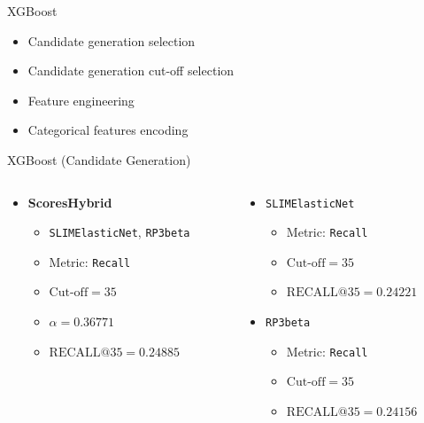 \documentclass{beamer}
\begin{document}
\begin{frame}{XGBoost}
  \begin{itemize}
    \item Candidate generation selection
    \item Candidate generation cut-off selection
    \item Feature engineering
    \item Categorical features encoding
  \end{itemize}
\end{frame}

\begin{frame}{XGBoost (Candidate Generation)}
  \begin{columns}[t]
    \begin{column}{0.5\textwidth}
      \begin{itemize}
        \item \textbf{ScoresHybrid}
        \begin{itemize}
          \item \texttt{SLIMElasticNet}, \texttt{RP3beta}
          \item Metric: \texttt{Recall}
          \item $\text{Cut-off}=35$
          \item $\alpha=0.36771$
          \item $\text{RECALL@}35=0.24885$
        \end{itemize}
      \end{itemize}
    \end{column}

    \begin{column}{0.5\textwidth}
      \begin{itemize}
        \item \texttt{SLIMElasticNet}
        \begin{itemize}
          \item Metric: \texttt{Recall}
          \item $\text{Cut-off}=35$
          \item $\text{RECALL@}35=0.24221$
        \end{itemize}
        \item \texttt{RP3beta}
        \begin{itemize}
          \item Metric: \texttt{Recall}
          \item $\text{Cut-off}=35$
          \item $\text{RECALL@}35=0.24156$
        \end{itemize}
      \end{itemize}
    \end{column}
  \end{columns}
\end{frame}
\end{document}
